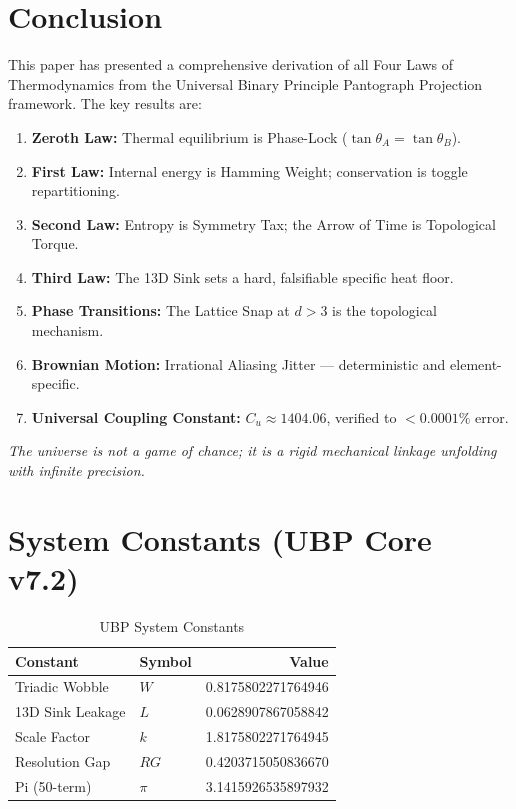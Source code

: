 \documentclass[12pt,a4paper]{article}
\begin{document}
\section{Conclusion}

This paper has presented a comprehensive derivation of all Four Laws of Thermodynamics from the Universal Binary Principle Pantograph Projection framework. The key results are:

\begin{enumerate}
\item \textbf{Zeroth Law:} Thermal equilibrium is Phase-Lock ($\tan \theta_A = \tan \theta_B$).
\item \textbf{First Law:} Internal energy is Hamming Weight; conservation is toggle repartitioning.
\item \textbf{Second Law:} Entropy is Symmetry Tax; the Arrow of Time is Topological Torque.
\item \textbf{Third Law:} The 13D Sink sets a hard, falsifiable specific heat floor.
\item \textbf{Phase Transitions:} The Lattice Snap at $d > 3$ is the topological mechanism.
\item \textbf{Brownian Motion:} Irrational Aliasing Jitter --- deterministic and element-specific.
\item \textbf{Universal Coupling Constant:} $C_u \approx 1404.06$, verified to $<0.0001\%$ error.
\end{enumerate}

\textit{The universe is not a game of chance; it is a rigid mechanical linkage unfolding with infinite precision.}

\appendix

\section{System Constants (UBP Core v7.2)}

\begin{table}[H]
\centering
\caption{UBP System Constants}
\begin{tabular}{@{}llr@{}}
\toprule
\textbf{Constant} & \textbf{Symbol} & \textbf{Value} \\
\midrule
Triadic Wobble & $W$ & 0.8175802271764946 \\
13D Sink Leakage & $L$ & 0.0628907867058842 \\
Scale Factor & $k$ & 1.8175802271764945 \\
Resolution Gap & $RG$ & 0.4203715050836670 \\
Pi (50-term) & $\pi$ & 3.1415926535897932 \\
\bottomrule
\end{tabular}
\end{table}
\end{document}
